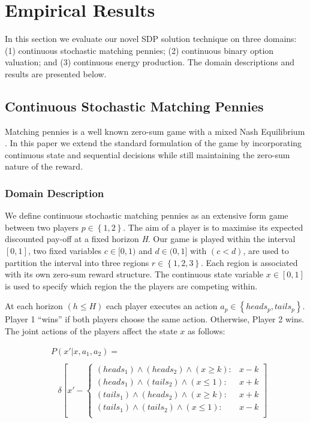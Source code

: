 \section{Empirical Results}
\label{sec:results}

In this section we evaluate our novel SDP solution technique on three
domains: (1) continuous stochastic matching pennies; (2) continuous
binary option valuation; and (3) continuous energy production. 
The domain descriptions and results are presented
below.

\subsection{Continuous Stochastic Matching Pennies}

Matching pennies is a well known zero-sum game with a 
mixed Nash Equilibrium \cite{Osborne_2004}. In this paper we extend 
the standard formulation of the game by incorporating continuous state 
and sequential decisions while still maintaining the zero-sum nature of 
the reward.

\subsubsection{Domain Description}

We define continuous stochastic matching pennies as an extensive
form game between two players $p \in \left\{1, 2 \right\}$. The aim of a 
player is to maximise its expected discounted pay-off at a fixed horizon \emph{H}. 
Our game is played within the interval $[0, 1]$, two fixed variables 
$c \in [0, 1)$ and $d \in (0, 1]$ with $(c < d)$,  are used to partition the interval into
three regions $r \in \left\{1, 2, 3 \right\}$. Each region is associated 
with its own zero-sum reward structure. The continuous state variable 
$x \in [0, 1]$ is used to specify which region the the players are competing within.

At each horizon $(h \leq H)$ each player executes an action $a_p \in \left\{ heads_p, tails_p \right\}$. 
Player 1 ``wins'' if both players choose the same action. Otherwise, Player 2 wins. 
The joint actions of the players affect the state $x$ as follows:

{\small 
\abovedisplayskip=0pt
\belowdisplayskip=0pt
\begin{align*}
&P(x' | x, a_{1}, a_{2}) = \\
\\
& \hspace{10pt} \delta \left[ x' - \begin{cases}
      (heads_{1}) \wedge (heads_{2}) \wedge (x \geq k) : & x - k \\
      (heads_{1}) \wedge (tails_{2}) \wedge (x \leq 1) : & x + k \\
      (tails_{1}) \wedge (heads_{2}) \wedge (x \geq k): & x + k \\
      (tails_{1}) \wedge (tails_{2}) \wedge (x \leq 1) : & x - k  \\
    \end{cases} \right]
\end{align*}
}%

